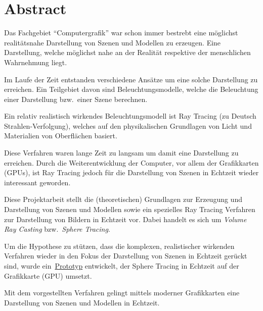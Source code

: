 
\chapter*{Abstract}
\label{chap:abstract}

Das Fachgebiet ``Computergrafik'' war schon immer bestrebt eine
möglichst realitätsnahe Darstellung von Szenen und Modellen zu erzeugen.
Eine Darstellung, welche möglichst nahe an der Realität respektive der
menschlichen Wahrnehmung liegt.

Im Laufe der Zeit entstanden verschiedene Ansätze um eine solche
Darstellung zu erreichen. Ein Teilgebiet davon sind Beleuchtungsmodelle,
welche die Beleuchtung einer Darstellung bzw.~einer Szene berechnen.

Ein relativ realistisch wirkendes Beleuchtungsmodell ist Ray Tracing (zu
Deutsch Strahlen-Verfolgung), welches auf den physikalischen Grundlagen
von Licht und Materialien von Oberflächen basiert.

Diese Verfahren waren lange Zeit zu langsam um damit eine Darstellung zu
erreichen. Durch die Weiterentwicklung der Computer, vor allem der
Grafikkarten (GPUs), ist Ray Tracing jedoch für die Darstellung von
Szenen in Echtzeit wieder interessant geworden.

Diese Projektarbeit stellt die (theoretischen) Grundlagen zur Erzeugung
und Darstellung von Szenen und Modellen sowie ein spezielles Ray Tracing
Verfahren zur Darstellung von Bildern in Echtzeit vor. Dabei handelt es
sich um \textit{Volume Ray Casting} bzw.~\textit{Sphere Tracing}.

Um die Hypothese zu stützen, dass die komplexen, realistischer wirkenden
Verfahren wieder in den Fokus der Darstellung von Szenen in Echtzeit
gerückt sind, wurde ein~\hyperref[chap:prototype]{Prototyp} entwickelt, der Sphere Tracing in
Echtzeit auf der Grafikkarte (GPU) umsetzt.

Mit dem vorgestellten Verfahren gelingt mittels moderner Grafikkarten
eine Darstellung von Szenen und Modellen in Echtzeit.
